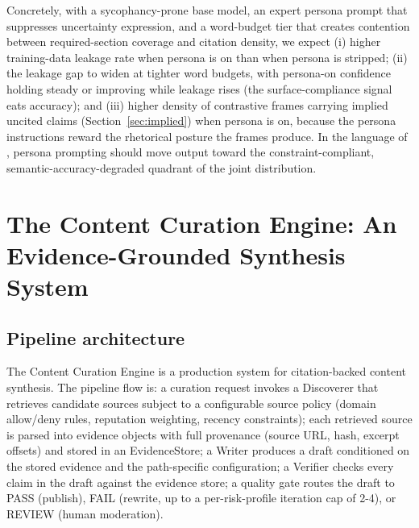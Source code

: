 \documentclass[11pt]{article}
\begin{document}
Concretely, with a sycophancy-prone base model, an expert persona prompt
that suppresses uncertainty expression, and a word-budget tier that
creates contention between required-section coverage and citation density,
we expect (i) higher training-data leakage rate when persona is on than
when persona is stripped; (ii) the leakage gap to widen at tighter word
budgets, with persona-on confidence holding steady or improving while
leakage rises (the surface-compliance signal eats accuracy); and
(iii) higher density of contrastive frames carrying implied uncited
claims (Section~\ref{sec:implied}) when persona is on, because the
persona instructions reward the rhetorical posture the frames produce.
In the language of \citet{baxi_compliance_2025}, persona prompting should
move output toward the constraint-compliant, semantic-accuracy-degraded
quadrant of the joint distribution.


\section{The Content Curation Engine: An Evidence-Grounded Synthesis System}
\label{sec:cce}

\subsection{Pipeline architecture}

The Content Curation Engine is a production system for citation-backed
content synthesis. The pipeline flow is: a curation request invokes a
Discoverer that retrieves candidate sources subject to a configurable
source policy (domain allow/deny rules, reputation weighting, recency
constraints); each retrieved source is parsed into evidence objects with
full provenance (source URL, hash, excerpt offsets) and stored in an
EvidenceStore; a Writer produces a draft conditioned on the stored
evidence and the path-specific configuration; a Verifier checks every
claim in the draft against the evidence store; a quality gate routes the
draft to PASS (publish), FAIL (rewrite, up to a per-risk-profile
iteration cap of 2-4), or REVIEW (human moderation).
\end{document}
